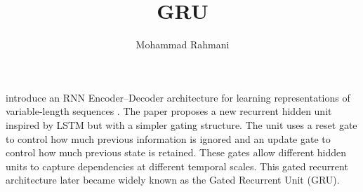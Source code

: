 \documentclass[a4paper]{article}
\title{GRU}
\date{}
\author{Mohammad Rahmani}
\begin{document}
   \maketitle

   \cite{cho-2014-learning-phrase-representations-using-rnn-encoder-decoder-for-statistical-machine-translation} introduce an RNN Encoder--Decoder architecture for learning representations of variable-length sequences .
   The paper proposes a new recurrent hidden unit inspired by LSTM but with a simpler gating structure. The unit uses a reset gate to control how much previous information is ignored and an update gate to control how much previous state is retained. These gates allow different hidden units to capture dependencies at different temporal scales. This gated recurrent architecture later became widely known as the Gated Recurrent Unit (GRU).
   
   
\end{document}
